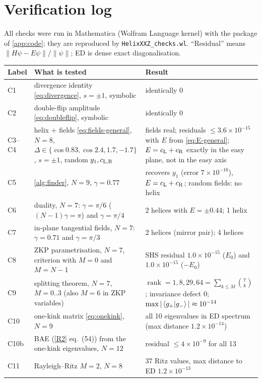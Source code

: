 \documentclass[11pt,a4paper]{article}
\theoremstyle{definition}
\begin{document}
\appendix
\section{Verification log}\label{app:checks}
All checks were run in Mathematica (Wolfram Language kernel) with the package of \cref{app:code}; they are reproduced by \texttt{HelixXXZ\_checks.wl}. ``Residual'' means $\|H\psi-E\psi\|/\|\psi\|$; ED is dense exact diagonalisation.
\begin{center}
\small
\begin{longtable}{p{0.9cm}p{6.6cm}p{6.6cm}}
\toprule
Label & What is tested & Result\\ \midrule
\endhead
C1 & divergence identity \eqref{eq:divergence}, $s=\pm1$, symbolic & identically $0$\\
C2 & double-flip amplitude \eqref{eq:doubleflip}, symbolic & identically $0$\\
C3--C4 & helix + fields \eqref{eq:fields-general}, $N=8$, $\Delta\in\{\cos0.83,\cos2.4,1.7,-1.7\}$, $s=\pm1$, random $y_1,c_{\rm L,R}$ & fields real; residuals $\le3.6\times10^{-15}$ with $E$ from \eqref{eq:E-general}; $E=c_{\rm L}+c_{\rm R}$ exactly in the easy plane, not in the easy axis\\
C5 & \cref{alg:finder}, $N=9$, $\gamma=0.77$ & recovers $y_1$ (error $7\times10^{-16}$), $E=c_{\rm L}+c_{\rm R}$; random fields: no helix\\
C6 & duality, $N=7$: $\gamma=\pi/6$ ($(N-1)\gamma=\pi$) and $\gamma=\pi/4$ & 2 helices with $E=\pm0.44$; 1 helix\\
C7 & in-plane tangential fields, $N=7$: $\gamma=0.71$ and $\gamma=\pi/3$ & 2 helices (mirror pair); 4 helices\\
C8 & ZKP parametrisation, $N=7$, criterion with $M=0$ and $M=N-1$ & SHS residual $1.0\times10^{-15}$ ($E_0$) and $1.0\times10^{-15}$ ($-E_0$)\\
C9 & splitting theorem, $N=7$, $M=0..3$ (also $M=6$ in ZKP variables) & $\operatorname{rank}=1,8,29,64=\sum_{k\le M}\binom7k$; invariance defect $0$; $\max|\braket{g_+|g_-}|\approx10^{-14}$\\
C10 & one-kink matrix \eqref{eq:onekink}, $N=9$ & all 10 eigenvalues in ED spectrum (max distance $1.2\times10^{-14}$)\\
C10b & BAE (\ref{R2} eq.~(54)) from the one-kink eigenvalues, $N=12$ & residual $\le4\times10^{-9}$ for all 13\\
C11 & Rayleigh--Ritz $M=2$, $N=8$ & 37 Ritz values, max distance to ED $1.2\times10^{-13}$\\

\end{longtable}
\end{center}
\end{document}

